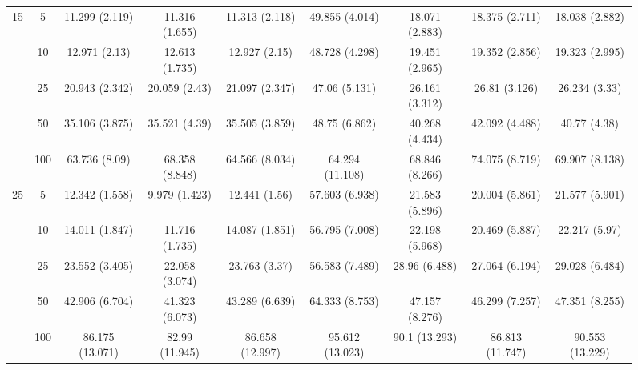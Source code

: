 \documentclass[10pt]{article}
\theoremstyle{definition}
\begin{document}
\begin{sidewaysfigure}
\begin{tabular}{cc|ccc|cccc}
  \multirow{5}{*}{15} & 5 & 11.299 (2.119) & 11.316 (1.655) & 11.313 (2.118) & 49.855 (4.014) & 18.071 (2.883) & 18.375 (2.711) & 18.038 (2.882) \\ 
  & 10 & 12.971 (2.13) & 12.613 (1.735) & 12.927 (2.15) & 48.728 (4.298) & 19.451 (2.965) & 19.352 (2.856) & 19.323 (2.995) \\ 
  & 25 & 20.943 (2.342) & 20.059 (2.43) & 21.097 (2.347) & 47.06 (5.131) & 26.161 (3.312) & 26.81 (3.126) & 26.234 (3.33) \\ 
  & 50 & 35.106 (3.875) & 35.521 (4.39) & 35.505 (3.859) & 48.75 (6.862) & 40.268 (4.434) & 42.092 (4.488) & 40.77 (4.38) \\ 
  & 100 & 63.736 (8.09) & 68.358 (8.848) & 64.566 (8.034) & 64.294 (11.108) & 68.846 (8.266) & 74.075 (8.719) & 69.907 (8.138) \\[.3cm]  
  \multirow{5}{*}{25} & 5 & 12.342 (1.558) & 9.979 (1.423) & 12.441 (1.56) & 57.603 (6.938) & 21.583 (5.896) & 20.004 (5.861) & 21.577 (5.901) \\ 
  & 10 & 14.011 (1.847) & 11.716 (1.735) & 14.087 (1.851) & 56.795 (7.008) & 22.198 (5.968) & 20.469 (5.887) & 22.217 (5.97) \\ 
  & 25 & 23.552 (3.405) & 22.058 (3.074) & 23.763 (3.37) & 56.583 (7.489) & 28.96 (6.488) & 27.064 (6.194) & 29.028 (6.484) \\ 
  & 50 & 42.906 (6.704) & 41.323 (6.073) & 43.289 (6.639) & 64.333 (8.753) & 47.157 (8.276) & 46.299 (7.257) & 47.351 (8.255) \\ 
  & 100 & 86.175 (13.071) & 82.99 (11.945) & 86.658 (12.997) & 95.612 (13.023) & 90.1 (13.293) & 86.813 (11.747) & 90.553 (13.229) \\ 
\end{tabular}
\end{sidewaysfigure}




\end{document}
